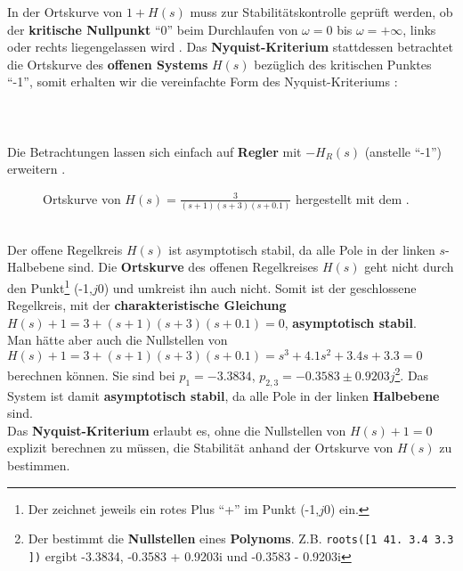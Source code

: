 {\nit In der Ortskurve von  $1+H(s)$ muss zur Stabilit\"atskontrolle gepr\"uft werden, ob der {\bf kritische Nullpunkt} ``0'' beim Durchlaufen von $\omega=0$ bis  $\omega=+\infty$, links oder rechts liegengelassen wird \cite{WOS:88}. Das {\bf Nyquist-Kriterium}  stattdessen betrachtet die Ortskurve des {\bf offenen Systems} $H(s)$ bez\"uglich des kritischen Punktes ``-1'', somit erhalten wir die vereinfachte Form des Nyquist-Kriteriums \cite{UNB:81}:\\~\\
\\~\\
Die Betrachtungen lassen sich einfach auf {\bf Regler}
mit $-H_R(s)$ (anstelle ``-1'') erweitern \cite{FRE:BOS:04, UNB:81}.
\begin{figure}[!htb]
\vspace*{-2mm}%
\begin{center}
  \vspace*{-3mm}\caption{Ortskurve von $H(s)=\frac{3}{(s+1)(s+3)(s+0.1)}$ hergestellt mit dem .}
\end{center}
\vspace*{-6mm}
\end{figure}\\
\nit Der offene Regelkreis $H(s)$ ist asymptotisch stabil, da alle
Pole in der linken $s$-Halbebene sind. Die {\bf
  Ortskurve} des offenen Regelkreises $H(s)$ geht
nicht durch den Punkt\footnote{Der  zeichnet jeweils
  ein rotes Plus ``+'' im Punkt (-1,$j0$) ein.} (-1,$j0$) und umkreist
ihn auch nicht.  Somit ist der geschlossene Regelkreis, mit der {\bf
  charakteristische Gleichung}
$H(s)+1=3+(s+1)(s+3)(s+0.1)=0$, {\bf asymptotisch
  stabil}.\\
Man h\"atte aber auch die Nullstellen von
$H(s)+1=3+(s+1)(s+3)(s+0.1)=s^3+4.1s^2+3.4s+3.3=0$ berechnen k\"onnen.
Sie sind bei $p_1=-3.3834$, $p_{2,3}=-0.3583\pm 0.9203j$\footnote{Der
   bestimmt die {\bf Nullstellen}
  eines {\bf Polynoms}. Z.B.  {\tt roots([1 41. 3.4 3.3
    ])} ergibt -3.3834, -0.3583 + 0.9203i und -0.3583 - 0.9203i}. Das
System ist damit {\bf asymptotisch stabil}, da alle Pole in der linken
{\bf Halbebene} sind.\\ Das {\bf
  Nyquist-Kriterium} erlaubt es, ohne die
Nullstellen von $H(s)+1=0$ explizit berechnen zu m\"ussen, die
Stabilit\"at anhand der Ortskurve von $H(s)$ zu bestimmen.  \newpage


}
